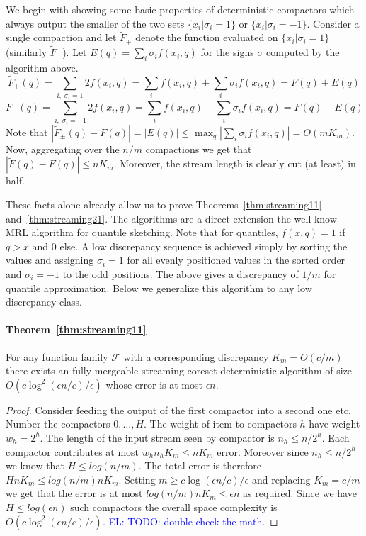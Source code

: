 \documentclass[anon,12pt]{colt2019} %
\newcommand{\el}[1]{\textcolor{blue}{EL: #1}}
\newcommand{\eps}{\epsilon}
\newcommand{\F}{\mathcal{F}}
\begin{document}
We begin with showing some basic properties of deterministic compactors which always output the smaller of the two sets  $\{ x_i | \sigma_i = 1\}$ or  $\{ x_i | \sigma_i = -1\}$. Consider a single compaction and let $\tilde F_{+}$ denote the function evaluated on $\{ x_i | \sigma_i = 1\}$ (similarly $\tilde F_{-}$).
Let $E(q) = \sum_i \sigma_i f(x_i,q)$ for the signs $\sigma$ computed by the algorithm above. 
$$\tilde F_{+}(q) = \sum_{i ,\; \sigma_i=1} 2f(x_i, q) = \sum_{i} f(x_i, q) +  \sum_{i} \sigma_i f(x_i, q) = F(q) + E(q)$$
$$\tilde F_{-}(q) = \sum_{i ,\; \sigma_i=-1} 2f(x_i, q) = \sum_{i} f(x_i, q) - \sum_{i} \sigma_i f(x_i, q) = F(q) - E(q)$$
Note that $|\tilde F_{\pm}(q) - F(q)| = |E(q)| \le \max_q |\sum_i \sigma_i f(x_i,q)| = O(mK_m)$. 
Now, aggregating over the $n/m$ compactions we get that $|\tilde F(q) - F(q)| \le n K_m$. Moreover, the stream length is clearly cut (at least) in half.

These facts alone already allow us to prove Theorems~\ref{thm:streaming11} and~\ref{thm:streaming21}. 
The algorithms are a direct extension the well know MRL algorithm \cite{MRL} for quantile sketching. 
Note that for quantiles, $f(x,q) = 1$ if $q > x$ and $0$ else. 
A low discrepancy sequence is achieved simply by sorting the values and assigning $\sigma_i = 1$ for all evenly positioned values in the sorted order and $\sigma_i=-1$ to the odd positions. The above gives a discrepancy of $1/m$ for quantile approximation.
Below we generalize this algorithm to any low discrepancy class.

\paragraph{Theorem~\ref{thm:streaming11}}
For any function family $\F$ with a corresponding discrepancy $K_m = O(c/m)$ there exists an fully-mergeable streaming coreset deterministic algorithm of size $O\left(c\log^2(\eps n/c)/\eps\right)$ whose error is at most $\eps n$.
\begin{proof}
Consider feeding the output of the first compactor into a second one etc. Number the compactors $0,\ldots,H$.
The weight of item to compactors $h$ have weight $w_h = 2^h$. The length of the input stream seen by compactor is $n_h \le n/2^h$.
Each compactor contributes at most $w_h n_h K_m \le n K_m$ error. Moreover since $n_h \le n/2^h$ we know that $H \le log(n/m)$.
The total error is therefore $H n K_m \le log(n/m) n K_m$. 
Setting $m \ge c\log(\eps n/c)/\eps$ and replacing $K_m = c/m$ we get that the error is at most $log(n/m) n K_m \le \eps n$ as required. 
Since we have $H \le log(\eps n)$ such compactors the overall space complexity is $O(c\log^2(\eps n/c)/\eps)$. \el{TODO: double check the math.}
\end{proof}
\end{document}
